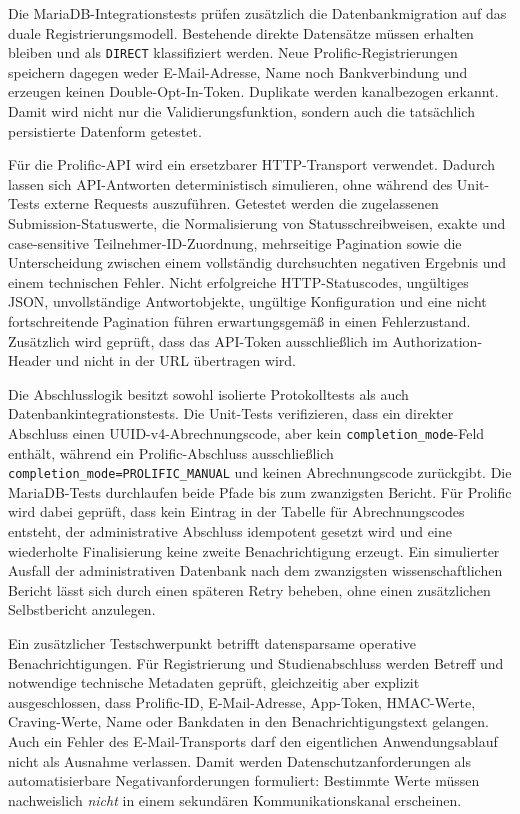 \begin{neu}
Die MariaDB-Integrationstests prüfen zusätzlich die Datenbankmigration auf das duale Registrierungsmodell. Bestehende direkte Datensätze müssen erhalten bleiben und als \texttt{DIRECT} klassifiziert werden. Neue Prolific-Registrierungen speichern dagegen weder E-Mail-Adresse, Name noch Bankverbindung und erzeugen keinen Double-Opt-In-Token. Duplikate werden kanalbezogen erkannt. Damit wird nicht nur die Validierungsfunktion, sondern auch die tatsächlich persistierte Datenform getestet.

Für die Prolific-API wird ein ersetzbarer HTTP-Transport verwendet. Dadurch lassen sich API-Antworten deterministisch simulieren, ohne während des Unit-Tests externe Requests auszuführen. Getestet werden die zugelassenen Submission-Statuswerte, die Normalisierung von Statusschreibweisen, exakte und case-sensitive Teilnehmer-ID-Zuordnung, mehrseitige Pagination sowie die Unterscheidung zwischen einem vollständig durchsuchten negativen Ergebnis und einem technischen Fehler. Nicht erfolgreiche HTTP-Statuscodes, ungültiges JSON, unvollständige Antwortobjekte, ungültige Konfiguration und eine nicht fortschreitende Pagination führen erwartungsgemäß in einen Fehlerzustand. Zusätzlich wird geprüft, dass das API-Token ausschließlich im Authorization-Header und nicht in der URL übertragen wird.

Die Abschlusslogik besitzt sowohl isolierte Protokolltests als auch Datenbankintegrationstests. Die Unit-Tests verifizieren, dass ein direkter Abschluss einen UUID-v4-Abrechnungscode, aber kein \texttt{completion\_mode}-Feld enthält, während ein Prolific-Abschluss ausschließlich \texttt{completion\_mode=PROLIFIC\_MANUAL} und keinen Abrechnungscode zurückgibt. Die MariaDB-Tests durchlaufen beide Pfade bis zum zwanzigsten Bericht. Für Prolific wird dabei geprüft, dass kein Eintrag in der Tabelle für Abrechnungscodes entsteht, der administrative Abschluss idempotent gesetzt wird und eine wiederholte Finalisierung keine zweite Benachrichtigung erzeugt. Ein simulierter Ausfall der administrativen Datenbank nach dem zwanzigsten wissenschaftlichen Bericht lässt sich durch einen späteren Retry beheben, ohne einen zusätzlichen Selbstbericht anzulegen.

Ein zusätzlicher Testschwerpunkt betrifft datensparsame operative Benachrichtigungen. Für Registrierung und Studienabschluss werden Betreff und notwendige technische Metadaten geprüft, gleichzeitig aber explizit ausgeschlossen, dass Prolific-ID, E-Mail-Adresse, App-Token, HMAC-Werte, Craving-Werte, Name oder Bankdaten in den Benachrichtigungstext gelangen. Auch ein Fehler des E-Mail-Transports darf den eigentlichen Anwendungsablauf nicht als Ausnahme verlassen. Damit werden Datenschutzanforderungen als automatisierbare Negativanforderungen formuliert: Bestimmte Werte müssen nachweislich \emph{nicht} in einem sekundären Kommunikationskanal erscheinen.


\end{neu}
